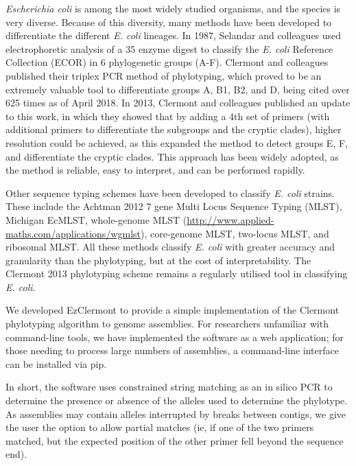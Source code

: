 \textit{Escherichia coli} is among the most widely studied organisms, and the species is very diverse\cite{Lukjancenko2010, Selander1987}.  Because of this diversity, many methods have been developed to differentiate the different  \textit{E. coli} lineages.  In 1987, Selandar  and colleagues used electrophoretic analysis of a 35 enzyme digest to classify the \textit{E. coli} Reference Collection (ECOR) in 6 phylogenetic groups (A-F)\cite{Selander1987}.  Clermont and colleagues published their triplex PCR method\cite{Clermont2000} of phylotyping, which proved to be an extremely valuable tool to differentiate groups A, B1, B2, and D, being cited over 625 times as of April 2018.  In 2013, Clermont and colleagues published an update to this work\cite{Clermont2013}, in which they showed that by adding a 4th set of primers (with additional primers to differentiate the subgroups and the cryptic clades), higher resolution could be achieved, as this expanded the method to detect groups E, F, and differentiate the cryptic clades.  This approach has been widely adopted, as the method is reliable, easy to interpret, and can be performed rapidly.

Other sequence typing schemes have been developed to classify \textit{E. coli} strains. These include the Achtman 2012 7 gene Multi Locus Sequence Typing (MLST)\cite{Achtman2012, Alikhan2018}, Michigan EcMLST\cite{Qi2004}, whole-genome MLST (\url{http://www.applied-maths.com/applications/wgmlst}), core-genome MLST\cite{DeBeen2015},  two-locus MLST\cite{Weissman2012}, and ribosomal MLST\cite{Jolley2012}.  All these methods classify \textit{E. coli} with greater accuracy and granularity than the phylotyping, but at the cost of interpretability.  The Clermont 2013 phylotyping scheme remains a regularly utilised tool in classifying \textit{E. coli}.

We developed EzClermont to provide a simple implementation of the Clermont phylotyping algorithm to genome assemblies.  For researchers unfamiliar with command-line tools, we have implemented the software as a web application; for those needing to process large numbers of assemblies, a command-line interface can be installed via pip.

In short, the software uses constrained string matching as an in silico PCR to determine the presence or absence of the alleles used to determine the phylotype. As assemblies may contain alleles interrupted by breaks between contigs, we give the user the option to allow partial matches (ie, if one of the two primers matched, but the expected position of the other primer fell beyond the sequence end).

